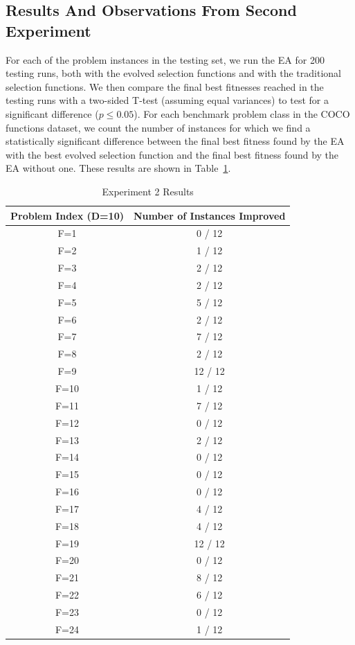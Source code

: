 \documentclass[times,12pt,titlepage]{mstogs}
\begin{document}
\begin{ThesisBody}
\section{Results And Observations From Second Experiment}
\label{secondExperimentResults}

For each of the problem instances in the testing set, we run the EA for 200 testing runs, both with the evolved selection functions and with the traditional selection functions. We then compare the final best fitnesses reached in the testing runs with a two-sided T-test (assuming equal variances) to test for a significant difference ($p \leq 0.05$). For each benchmark problem class in the COCO functions dataset, we count the number of instances for which we find a statistically significant difference between the final best fitness found by the EA with the best evolved selection function and the final best fitness found by the EA without one. These results are shown in Table~\ref{tab:experiment2results}. 

\begin{table}
\centering
  \caption{Experiment 2 Results}
  \label{tab:experiment2results}
  \begin{tabular}{c|c}
    \toprule
	Problem Index (D=10) & Number of Instances Improved \\
	\midrule
	F=1 & 0 / 12 \\
	\hline
	F=2 & 1 / 12 \\
	\hline
	F=3 & 2 / 12 \\
	\hline
	F=4 & 2 / 12 \\
	\hline
	F=5 & 5 / 12 \\
	\hline
	F=6 & 2 / 12 \\
	\hline
	F=7 & 7 / 12 \\
	\hline
	F=8 & 2 / 12 \\
	\hline
	F=9 & 12 / 12 \\
	\hline
	F=10 & 1 / 12 \\
	\hline
	F=11 & 7 / 12 \\
	\hline
	F=12 & 0 / 12 \\
	\hline
	F=13 & 2 / 12 \\
	\hline
	F=14 & 0 / 12 \\
	\hline
	F=15 & 0 / 12 \\
	\hline
	F=16 & 0 / 12 \\
	\hline
	F=17 & 4 / 12 \\
	\hline
	F=18 & 4 / 12 \\
	\hline
	F=19 & 12 / 12 \\
	\hline
	F=20 & 0 / 12 \\
	\hline
	F=21 & 8 / 12 \\
	\hline
	F=22 & 6 / 12 \\
	\hline
	F=23 & 0 / 12 \\
	\hline
	F=24 & 1 / 12 \\                       
	

\end{tabular}
\end{table}
\end{ThesisBody}
\end{document}
